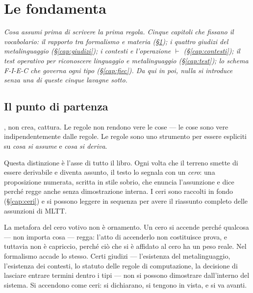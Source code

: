 \part{Le fondamenta}

\noindent\itshape Cosa assumi prima di scrivere la prima regola.
Cinque capitoli che fissano il vocabolario: il rapporto tra formalismo e materia
(\S\ref{cap:partenza}); i quattro giudizi del metalinguaggio (\S\ref{cap:giudizi});
i contesti e l'operazione $\vdash$ (\S\ref{cap:contesti});
il test operativo per riconoscere linguaggio e metalinguaggio
(\S\ref{cap:test}); lo schema F-I-E-C che governa ogni tipo
(\S\ref{cap:fiec}). Da qui in poi, nulla si introduce senza una di queste
cinque lavagne sotto.\upshape

\bigskip

\chapter{Il punto di partenza}\label{cap:partenza}

{}, non crea, cattura. Le regole non rendono vere le cose --- le cose sono vere indipendentemente dalle regole. Le regole sono uno strumento per essere espliciti su \emph{cosa si assume} e \emph{cosa si deriva}.

Questa distinzione \`e l'asse di tutto il libro. Ogni volta che il terreno smette di essere derivabile e diventa assunto, il testo lo segnala con un \emph{cero}: una proposizione numerata, scritta in stile sobrio, che enuncia l'assunzione e dice perch\'e regge anche senza dimostrazione interna. I ceri sono raccolti in fondo (\S\ref{cap:ceri}) e si possono leggere in sequenza per avere il riassunto completo delle assunzioni di MLTT.

\bigskip

\noindent La metafora del cero votivo non \`e ornamento. Un cero si accende perch\'e qualcosa --- non importa cosa --- regga: l'atto di accenderlo non costituisce prova, e tuttavia non \`e capriccio, perch\'e ci\`o che si \`e affidato al cero ha un peso reale. Nel formalismo accade lo stesso. Certi giudizi --- l'esistenza del metalinguaggio, l'esistenza dei contesti, lo statuto delle regole di computazione, la decisione di lasciare entrare termini dentro i tipi --- non si possono dimostrare dall'interno del sistema. Si accendono come ceri: si dichiarano, si tengono in vista, e si va avanti.

